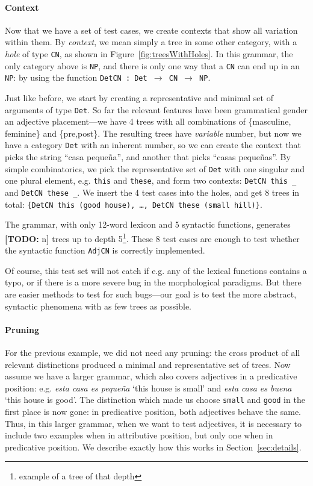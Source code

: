 \documentclass[11pt]{article}
\def\t#1{\texttt{#1}}
\newcommand{\todo}[1]{{\color{cyan}\textbf{[TODO: }#1\textbf{]}}}
\begin{document}
\paragraph{Context} 

Now that we have a set of test cases, we create contexts that show all
variation within them. By \emph{context}, we mean simply a tree in
some other category, with a \emph{hole} of type \t{CN}, as shown in
Figure~\ref{fig:treesWithHoles}. 
In this grammar, the only category above is \t{NP}, and there is only
one way that a \t{CN} can end up in an \t{NP}: by using the function
\t{DetCN : Det $\rightarrow$ CN $\rightarrow$ NP}. 

Just like before, we start by creating a representative and minimal
set of arguments of type \t{Det}. So far the relevant features have
been grammatical gender an adjective placement---we have 4 trees with
all combinations of \{masculine, feminine\} and \{pre,post\}. The
resulting trees have \emph{variable} number, but now we have a
category \t{Det} with an inherent number, so we can create the context
that picks the string ``casa  peque\~{n}a'', and another that picks
``casas  peque\~{n}as''. By simple combinatorics, we pick the
representative set of \t{Det} with one singular and one plural
element, e.g. \t{this} and \t{these}, and form two contexts:
\verb|DetCN this _| and  \verb|DetCN these _|. We insert the 4 test
cases into the holes, and get 8 trees in total: \t{\{DetCN this (good
  house), \dots, DetCN these (small hill)\}}. 


The grammar, with only 12-word lexicon and 5 syntactic functions,
generates \todo{n} trees up to depth 5\footnote{example of a tree of that depth}. 
These 8 test cases are enough to test whether the
syntactic function \t{AdjCN} is correctly implemented.   

Of course, this test set will not catch if e.g. any of the lexical
functions contains a typo, or if there is a more severe bug in the
morphological paradigms. But there are easier methods to test for such
bugs---our goal is to test the more abstract, syntactic phenomena with
as few trees as possible. 


\paragraph{Pruning}

For the previous example, we did not need any pruning: the cross
product of all relevant distinctions produced a minimal and
representative set of trees. Now assume we have a larger grammar,
which also covers adjectives in a predicative position:
e.g. \emph{esta casa es peque\~{n}a} `this house is small' and
\emph{esta casa es buena} `this house is good'. The distinction which
made us choose \t{small} and \t{good} in the first place is now gone:
in predicative position, both adjectives behave the same. Thus, in
this larger grammar, when we want to test adjectives, it is necessary
to include two examples when in attributive position, but only one
when in predicative position. We describe exactly how this works in
Section~\ref{sec:details}. 
\end{document}
